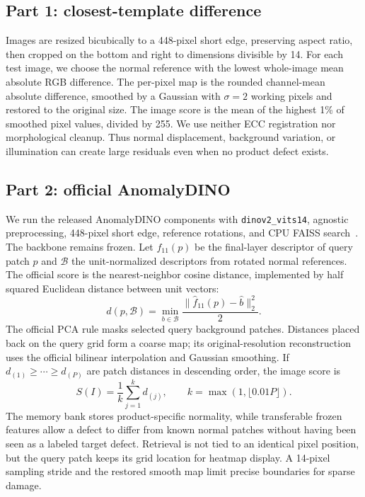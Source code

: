 \documentclass[times,10pt,twocolumn,letterpaper]{article}
\begin{document}
\subsection{Part 1: closest-template difference}
Images are resized bicubically to a 448-pixel short edge, preserving aspect ratio, then cropped on the bottom and right to dimensions divisible by 14. For each test image, we choose the normal reference with the lowest whole-image mean absolute RGB difference. The per-pixel map is the rounded channel-mean absolute difference, smoothed by a Gaussian with $\sigma=2$ working pixels and restored to the original size. The image score is the mean of the highest 1\% of smoothed pixel values, divided by 255. We use neither ECC registration nor morphological cleanup. Thus normal displacement, background variation, or illumination can create large residuals even when no product defect exists.

\subsection{Part 2: official AnomalyDINO}
We run the released AnomalyDINO components with \texttt{dinov2\_vits14}, agnostic preprocessing, 448-pixel short edge, reference rotations, and CPU FAISS search~\cite{damm2025anomalydino}. The backbone remains frozen. Let $f_{11}(p)$ be the final-layer descriptor of query patch $p$ and $\mathcal B$ the unit-normalized descriptors from rotated normal references. The official score is the nearest-neighbor cosine distance, implemented by half squared Euclidean distance between unit vectors:
\begin{equation}
  d(p,\mathcal B)=\min_{b\in\mathcal B}\frac{\lVert\hat f_{11}(p)-\hat b\rVert_2^2}{2}.
  \label{eq:distance}
\end{equation}
The official PCA rule masks selected query background patches. Distances placed back on the query grid form a coarse map; its original-resolution reconstruction uses the official bilinear interpolation and Gaussian smoothing. If $d_{(1)}\geq\cdots\geq d_{(P)}$ are patch distances in descending order, the image score is
\begin{equation}
  S(I)=\frac{1}{k}\sum_{j=1}^{k}d_{(j)},\qquad k=\max(1,\lfloor0.01P\rfloor).
  \label{eq:score}
\end{equation}
The memory bank stores product-specific normality, while transferable frozen features allow a defect to differ from known normal patches without having been seen as a labeled target defect. Retrieval is not tied to an identical pixel position, but the query patch keeps its grid location for heatmap display. A 14-pixel sampling stride and the restored smooth map limit precise boundaries for sparse damage.
\end{document}
